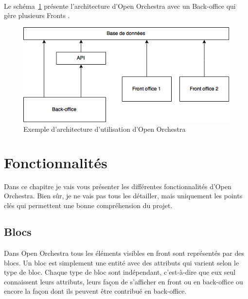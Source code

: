 	    \paragraph{}	
		Le schéma~\ref{architecture} présente l'architecture d'Open Orchestra avec un \og Back-office \fg{} qui gère plusieurs \og Fronts \fg{}.
		\begin{figure}[H]
        \begin{center}
          \includegraphics[scale=0.75]{images/architecture_open_orchestra}
        \end{center}
        \caption{Exemple d'architecture d'utilisation d'Open Orchestra}
        \label{architecture}
      \end{figure}

   
\section{Fonctionnalités}
	    \paragraph{}
	    Dans ce chapitre je vais vous présenter les différentes fonctionnalités d'Open Orchestra. Bien sûr, je ne vais pas tous les détailler, mais uniquement les points clés qui permettent une bonne compréhension du projet.
	      \subsection{Blocs}
	        \label{Blocs}  
	       \paragraph{}
	      Dans Open Orchestra tous les éléments visibles en front sont représentés par des blocs. Un bloc est simplement une entité avec des attributs qui varient selon le type de bloc. Chaque type de bloc sont indépendant, c'est-à-dire que eux seul connaissent leurs attributs, leurs façon de s'afficher en front ou en back-office ou encore la façon dont ils peuvent être contribué en back-office. 
